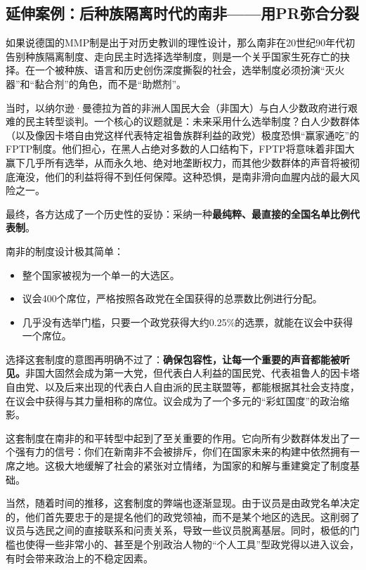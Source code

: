 \subsection{延伸案例：后种族隔离时代的南非——用PR弥合分裂}

如果说德国的MMP制是出于对历史教训的理性设计，那么南非在20世纪90年代初告别种族隔离制度、走向民主时选择选举制度，则是一个关乎国家生死存亡的抉择。在一个被种族、语言和历史创伤深度撕裂的社会，选举制度必须扮演“灭火器”和“黏合剂”的角色，而不是“助燃剂”。

当时，以纳尔逊·曼德拉为首的非洲人国民大会（非国大）与白人少数政府进行艰难的民主转型谈判。一个核心的议题就是：未来采用什么选举制度？白人少数群体（以及像因卡塔自由党这样代表特定祖鲁族群利益的政党）极度恐惧“赢家通吃”的FPTP制度。他们担心，在黑人占绝对多数的人口结构下，FPTP将意味着非国大赢下几乎所有选举，从而永久地、绝对地垄断权力，而其他少数群体的声音将被彻底淹没，他们的利益将得不到任何保障。这种恐惧，是南非滑向血腥内战的最大风险之一。

最终，各方达成了一个历史性的妥协：采纳一种\textbf{最纯粹、最直接的全国名单比例代表制}。

南非的制度设计极其简单：

\begin{itemize}
    \item 整个国家被视为一个单一的大选区。
    \item 议会400个席位，严格按照各政党在全国获得的总票数比例进行分配。
    \item 几乎没有选举门槛，只要一个政党获得大约0.25\%的选票，就能在议会中获得一个席位。
\end{itemize}

选择这套制度的意图再明确不过了：\textbf{确保包容性，让每一个重要的声音都能被听见。}非国大固然会成为第一大党，但代表白人利益的国民党、代表祖鲁人的因卡塔自由党、以及后来出现的代表白人自由派的民主联盟等，都能根据其社会支持度，在议会中获得与其力量相称的席位。议会成为了一个多元的“彩虹国度”的政治缩影。

这套制度在南非的和平转型中起到了至关重要的作用。它向所有少数群体发出了一个强有力的信号：你们在新南非不会被排斥，你们在国家未来的构建中依然拥有一席之地。这极大地缓解了社会的紧张对立情绪，为国家的和解与重建奠定了制度基础。

当然，随着时间的推移，这套制度的弊端也逐渐显现。由于议员是由政党名单决定的，他们首先要忠于的是提名他们的政党领袖，而不是某个地区的选民。这削弱了议员与选民之间的直接联系和问责关系，导致一些议员脱离基层。同时，极低的门槛也使得一些非常小的、甚至是个别政治人物的“个人工具”型政党得以进入议会，有时会带来政治上的不稳定因素。

